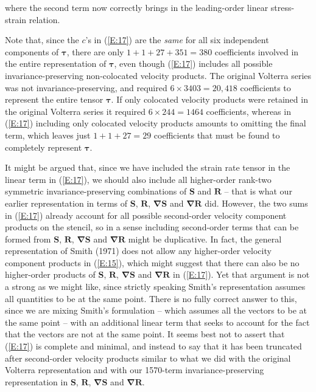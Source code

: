 where the second term now correctly brings in the leading-order linear stress-strain relation.

Note that, since the $c$'s in (\ref{E:17}) are the \textit{same} for all six independent components of $\mathbf{\tau}$, there are only $1 + 1 + 27 + 351 = 380$ coefficients involved in the entire representation of $\mathbf{\tau}$, even though (\ref{E:17}) includes all possible invariance-preserving non-colocated velocity products. The original Volterra series was not invariance-preserving, and required  $6 \times 3403 = 20,418$ coefficients to represent the entire tensor $\mathbf{\tau}$. If only colocated velocity products were retained in the original Volterra series it required $6 \times 244 = 1464$  coefficients, whereas in (\ref{E:17}) including only colocated velocity products amounts to omitting the final term, which leaves just $1 + 1 + 27 = 29$ coefficients that must be found to completely represent $\mathbf{\tau}$.

It might be argued that, since we have included the strain rate tensor in the linear term in (\ref{E:17}), we should also include all higher-order rank-two symmetric invariance-preserving combinations of $\mathbf{S}$ and $\mathbf{R}$ – that is what our earlier representation in terms of $\mathbf{S}$, $\mathbf{R}$, $\mathbf{\nabla S}$ and $\mathbf{\nabla R}$ did. However, the two sums in (\ref{E:17}) already account for all possible second-order velocity component products on the stencil, so in a sense including second-order terms that can be formed from $\mathbf{S}$, $\mathbf{R}$, $\mathbf{\nabla S}$ and $\mathbf{\nabla R}$ might be duplicative. In fact, the general representation of Smith (1971) does not allow any higher-order velocity component products in (\ref{E:15}), which might suggest that there can also be no higher-order products of $\mathbf{S}$, $\mathbf{R}$, $\mathbf{\nabla S}$ and $\mathbf{\nabla R}$ in (\ref{E:17}). Yet that argument is not a strong as we might like, since strictly speaking Smith’s representation assumes all quantities to be at the same point.  There is no fully correct answer to this, since we are mixing Smith’s formulation – which assumes all the vectors to be at the same point -- with an additional linear term that seeks to account for the fact that the vectors are not at the same point. It seems best not to assert that (\ref{E:17}) is complete and minimal, and instead to say that it has been truncated after second-order velocity products similar to what we did with the original Volterra representation and with our 1570-term invariance-preserving representation in $\mathbf{S}$, $\mathbf{R}$, $\mathbf{\nabla S}$ and $\mathbf{\nabla R}$.


